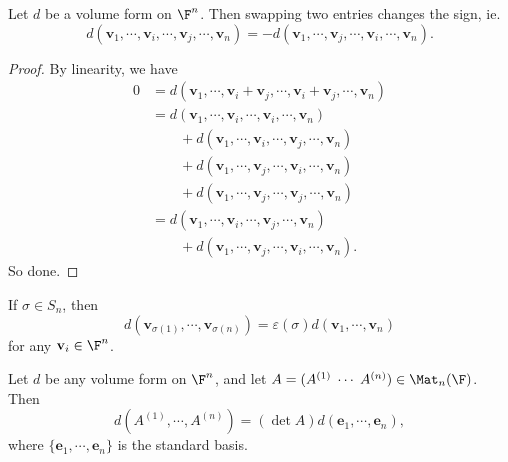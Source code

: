 \documentclass[a4paper]{article}
\begin{document}
\begin{lemma}
  Let $d$ be a volume form on $\F^n$. Then swapping two entries changes the sign, ie.
  \[
    d (\mathbf{v}_1, \cdots, \mathbf{v}_i, \cdots, \mathbf{v}_j,\cdots, \mathbf{v}_n) = -d(\mathbf{v}_1, \cdots, \mathbf{v}_j, \cdots, \mathbf{v}_i, \cdots, \mathbf{v}_n).
  \]
\end{lemma}

\begin{proof}
  By linearity, we have
  \begin{align*}
    0 &= d(\mathbf{v}_1, \cdots, \mathbf{v}_i + \mathbf{v}_j, \cdots, \mathbf{v}_i + \mathbf{v}_j, \cdots,\mathbf{v}_n) \\
    &= d(\mathbf{v}_1, \cdots, \mathbf{v}_i, \cdots, \mathbf{v}_i, \cdots, \mathbf{v}_n)\\
    &\quad\quad+ d(\mathbf{v}_1, \cdots, \mathbf{v}_i, \cdots, \mathbf{v}_j, \cdots, \mathbf{v}_n)\\
    &\quad\quad+ d(\mathbf{v}_1, \cdots, \mathbf{v}_j, \cdots, \mathbf{v}_i, \cdots, \mathbf{v}_n)\\
    &\quad\quad+ d(\mathbf{v}_1, \cdots, \mathbf{v}_j, \cdots, \mathbf{v}_j, \cdots, \mathbf{v}_n)\\
    &= d(\mathbf{v}_1, \cdots, \mathbf{v}_i, \cdots, \mathbf{v}_j, \cdots, \mathbf{v}_n)\\
    &\quad\quad+ d(\mathbf{v}_1, \cdots, \mathbf{v}_j, \cdots, \mathbf{v}_i, \cdots, \mathbf{v}_n).
  \end{align*}
  So done.
\end{proof}

\begin{cor}
  If $\sigma \in S_n$, then
  \[
    d(\mathbf{v}_{\sigma(1)}, \cdots, \mathbf{v}_{\sigma(n)}) = \varepsilon(\sigma) d(\mathbf{v}_1,\cdots, \mathbf{v}_n)
  \]
  for any $\mathbf{v}_i \in \F^n$.
\end{cor}

\begin{thm}
  Let $d$ be any volume form on $\F^n$, and let $A = (A^{(1)}\;\cdots \;A^{(n)}) \in \Mat_n(\F)$. Then
  \[
    d(A^{(1)}, \cdots, A^{(n)}) = (\det A) d(\mathbf{e}_1, \cdots, \mathbf{e}_n),
  \]
  where $\{\mathbf{e}_1, \cdots, \mathbf{e}_n\}$ is the standard basis.
\end{thm}
\end{document}
